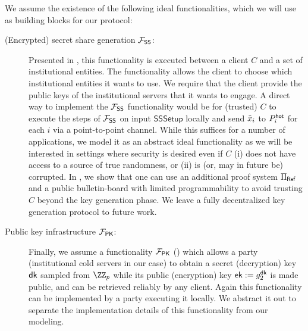 We assume the existence of the following ideal functionalities, which we will use as building blocks for our protocol:
\begin{description}
\item[(Encrypted) secret share generation $\mathcal{F}_\mathsf{SS}$:]
    Presented in , this functionality is executed between a client $C$ 
    and a set of institutional entities. %
    The functionality allows the client to choose which institutional entities it wants to use. We require that the client provide the public keys of the institutional servers that it wants to engage. 
    A direct way to implement the $\mathcal{F}_\mathsf{SS}$ functionality would be for (trusted) $C$ to execute the steps of $\mathcal{F}_\mathsf{SS}$ on input $\mathsf{SSSetup}$ locally and send $\tilde{x}_i$ to $P_i^{\mathsf{hot}}$ for each $i$ via a point-to-point channel.
    While this suffices for a number of applications, we model it as an abstract ideal functionality as we will be interested in settings where security is desired even if $C$ (i) does not have access to a source of true randomness, or (ii)  is (or, may in future be) corrupted. 
    In , we show that one can use an additional proof system $\Pi_{\sf Ref}$ and a public bulletin-board with limited programmability to avoid trusting $C$ beyond the key generation phase. We leave a fully decentralized key generation protocol to future work.
    
\item[Public key infrastructure $\mathcal{F}_\mathsf{PK}$:] 
Finally, we assume a functionality $\mathcal{F}_\mathsf{PK}$ () which allows a party (institutional cold servers in our case) to obtain a secret (decryption) key $\mathsf{dk}$ sampled from $\ZZ_p$ while its public (encryption) key $\mathsf{ek} := g_2^{\mathsf{dk}}$ is made public, and can be retrieved reliably by any client. Again this functionality can be implemented by a party executing it locally. We abstract it out to separate the implementation details of this functionality from our modeling.

\end{description}


